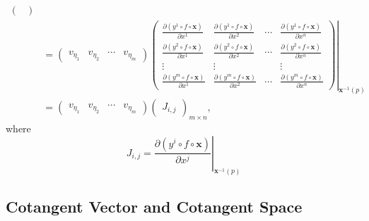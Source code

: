 \documentclass{report}
\begin{document}
{\[\begin{aligned}
\begin{pmatrix}
            \end{pmatrix}\\
            &=
            \begin{pmatrix}
            v_{\eta_1}&v_{\eta_2}&\cdots&v_{\eta_m}
            \end{pmatrix}
            \left.\begin{pmatrix}
                \frac{\partial(y^1 \circ f\circ\mathbf{x})}{\partial x^1}&\frac{\partial(y^1 \circ f\circ\mathbf{x})}{\partial x^2}&\cdots&\frac{\partial(y^1 \circ f\circ\mathbf{x})}{\partial x^n}\\
                \frac{\partial(y^2 \circ f\circ\mathbf{x})}{\partial x^1}&\frac{\partial(y^2 \circ f\circ\mathbf{x})}{\partial x^2}&\cdots&\frac{\partial(y^2 \circ f\circ\mathbf{x})}{\partial x^n}\\
                \vdots&\vdots&&\vdots\\
                \frac{\partial(y^m \circ f\circ\mathbf{x})}{\partial x^1}&\frac{\partial(y^m \circ f\circ\mathbf{x})}{\partial x^2}&\cdots&\frac{\partial(y^m \circ f\circ\mathbf{x})}{\partial x^n}
            \end{pmatrix}\right|_{\mathbf{x}^{-1}(p)}\\
            &=
            \begin{pmatrix}
            v_{\eta_1}&v_{\eta_2}&\cdots&v_{\eta_m}
            \end{pmatrix}
            \begin{pmatrix}
           J_{i,j}
           \end{pmatrix}_{m\times n},
        \end{aligned}
    \]
    where
    \[
        J_{i,j}=\left.\frac{\partial(y^i \circ f\circ\mathbf{x})}{\partial x^j}\right|_{\mathbf{x}^{-1}(p)}
        \]
}

\subsection{Cotangent Vector and Cotangent Space}
\end{document}

